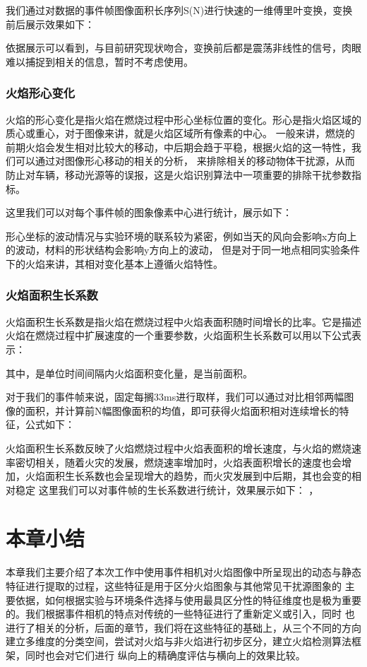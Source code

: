 我们通过对数据的事件帧图像面积长序列S(N)进行快速的一维傅里叶变换，变换前后展示效果如下：

依据展示可以看到，与目前研究现状吻合，变换前后都是震荡非线性的信号，肉眼难以捕捉到相关的信息，暂时不考虑使用。

\subsubsection{火焰形心变化}
火焰的形心变化是指火焰在燃烧过程中形心坐标位置的变化。形心是指火焰区域的质心或重心，对于图像来讲，就是火焰区域所有像素的中心。
一般来讲，燃烧的前期火焰会发生相对比较大的移动，中后期会趋于平稳，根据火焰的这一特性，我们可以通过对图像形心移动的相关的分析，
来排除相关的移动物体干扰源，从而防止对车辆，移动光源等的误报，这是火焰识别算法中一项重要的排除干扰参数指标。

这里我们可以对每个事件帧的图象像素中心进行统计，展示如下：

形心坐标的波动情况与实验环境的联系较为紧密，例如当天的风向会影响x方向上的波动，材料的形状结构会影响y方向上的波动，
但是对于同一地点相同实验条件下的火焰来讲，其相对变化基本上遵循火焰特性。

\subsubsection{火焰面积生长系数}
火焰面积生长系数是指火焰在燃烧过程中火焰表面积随时间增长的比率。它是描述火焰在燃烧过程中扩展速度的一个重要参数，火焰面积生长系数可以用以下公式表示：

其中，是单位时间间隔内火焰面积变化量，是当前面积。

对于我们的事件帧来说，固定每搁33ms进行取样，我们可以通过对比相邻两幅图像的面积，并计算前N幅图像面积的均值，即可获得火焰面积相对连续增长的特征，公式如下：

火焰面积生长系数反映了火焰燃烧过程中火焰表面积的增长速度，与火焰的燃烧速率密切相关，随着火灾的发展，燃烧速率增加时，火焰表面积增长的速度也会增加，火焰面积生长系数也会呈现增大的趋势，而火灾发展到中后期，其也会变的相对稳定
这里我们可以对事件帧的生长系数进行统计，效果展示如下：
，


\section{本章小结}
本章我们主要介绍了本次工作中使用事件相机对火焰图像中所呈现出的动态与静态特征进行提取的过程，这些特征是用于区分火焰图象与其他常见干扰源图象的
主要依据，如何根据实验与环境条件选择与使用最具区分性的特征维度也是极为重要的。我们根据事件相机的特点对传统的一些特征进行了重新定义或引入，同时
也进行了相关的分析，后面的章节，我们将在这些特征的基础上，从三个不同的方向建立多维度的分类空间，尝试对火焰与非火焰进行初步区分，建立火焰检测算法框架，同时也会对它们进行
纵向上的精确度评估与横向上的效果比较。